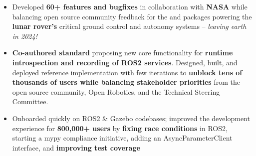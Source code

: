 \documentclass[10pt,a4paper,ragged2e,withhyper]{altacv}
\begin{document}

\begin{itemize}
  \item Developed \textbf{60+ features and bugfixes} in collaboration with \textbf{NASA} while balancing open source community feedback for the  and  packages powering the \textbf{ lunar rover's} critical ground control and autonomy systems -- \textit{leaving earth in 2024!}
\item \textbf{Co-authored  standard} proposing new core functionality for \textbf{runtime introspection and recording of ROS2 services}. Designed, built, and deployed reference implementation with few iterations to \textbf{unblock tens of thousands of users while balancing stakeholder priorities} from the open source community, Open Robotics, and the Technical Steering Committee.
  \item Onboarded quickly on ROS2 \& Gazebo codebases; improved the development experience for \textbf{800,000+ users} by \textbf{fixing race conditions} in ROS2, starting a mypy compliance initiative, adding an AsyncParameterClient interface, and \textbf{improving test coverage}
  

\end{itemize}
\end{document}

